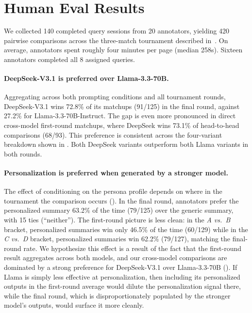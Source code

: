 \clearpage
\section[Human Eval Results]{Human Eval Results \hyperref[chsevenrq2]{\chsevenrqtwo}}\label{sec:ch-7-human-eval-results}

We collected 140 completed query sessions from 20 annotators, yielding 420 pairwise comparisons across the three-match tournament described in~. On average, annotators spent roughly four minutes per page (median 258s). Sixteen annotators completed all 8 assigned queries.

\paragraph{DeepSeek-V3.1 is preferred over Llama-3.3-70B.}
Aggregating across both prompting conditions and all tournament rounds, DeepSeek-V3.1 wins 72.8\% of its matchups (91/125) in the final round, against 27.2\% for Llama-3.3-70B-Instruct. The gap is even more pronounced in direct cross-model first-round matchups, where DeepSeek wins 73.1\% of head-to-head comparisons (68/93). This preference is consistent across the four-variant breakdown shown in . Both DeepSeek variants outperform both Llama variants in both rounds.

\paragraph{Personalization is preferred when generated by a stronger model.}
The effect of conditioning on the persona profile depends on where in the tournament the comparison occurs (). In the final round, annotators prefer the personalized summary 63.2\% of the time (79/125) over the generic summary, with 15 ties (``neither''). The first-round picture is less clean: in the \emph{A vs.\ B} bracket, personalized summaries win only 46.5\% of the time (60/129) while in the \emph{C vs.\ D} bracket, personalized summaries win 62.2\% (79/127), matching the final-round rate. We hypothesize this effect is a result of the fact that the first-round result aggregates across both models, and our cross-model comparisons are dominated by a strong preference for DeepSeek-V3.1 over Llama-3.3-70B (). If Llama is simply less effective at personalization, then including its personalized outputs in the first-round average would dilute the personalization signal there, while the final round, which is disproportionately populated by the stronger model's outputs, would surface it more cleanly. 

